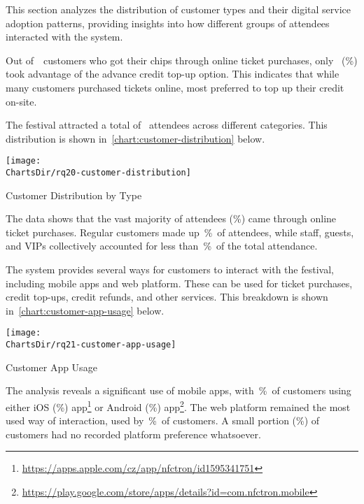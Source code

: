 This section analyzes the distribution of customer types and their digital service adoption patterns, providing insights into how different groups of attendees interacted with the system.


Out of~~customers who got their chips through online ticket purchases, only ~(\%) took advantage of the advance credit top-up option.
This indicates that while many customers purchased tickets online, most preferred to top up their credit on-site.


The festival attracted a total of~ attendees across different categories.
This distribution is shown in~\autoref{chart:customer-distribution} below.

\begin{chart}[H]
	\centering
	\texttt{[image: \\ChartsDir/rq20-customer-distribution]}
	\caption{ Customer Distribution by Type}
	\label{chart:customer-distribution}
	\source
\end{chart}

The data shows that the vast majority of attendees (\%) came through online ticket purchases.
Regular customers made up~\%~of attendees, while staff, guests, and VIPs collectively accounted for less than~\%~of the total attendance.


The system provides several ways for customers to interact with the festival, including mobile apps and web platform.
These can be used for ticket purchases, credit top-ups, credit refunds, and other services.
This breakdown is shown in~\autoref{chart:customer-app-usage} below.

\begin{chart}[h]
	\centering
	\texttt{[image: \\ChartsDir/rq21-customer-app-usage]}
	\caption{ Customer App Usage}
	\label{chart:customer-app-usage}
	\source
\end{chart}

The analysis reveals a significant use of mobile apps, with~\%~of customers using either iOS (\%) app\footnote{\url{https://apps.apple.com/cz/app/nfctron/id1595341751}}
or Android (\%) app\footnote{\url{https://play.google.com/store/apps/details?id=com.nfctron.mobile}}.
The web platform remained the most used way of interaction, used by~\%~of customers.
A small portion (\%) of customers had no recorded platform preference whatsoever.

